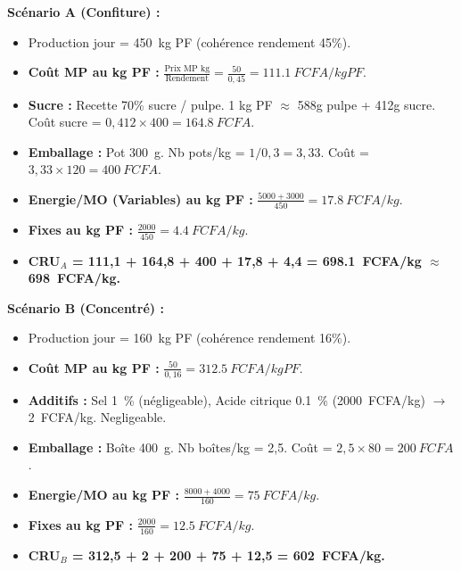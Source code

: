 \documentclass[11pt]{article}
\begin{document}
\begin{exoresolu}
\begin{enumerate}
            \textbf{Scénario A (Confiture) :}
            \begin{itemize}
                \item Production jour = \SI{450}{kg} PF (cohérence rendement 45\%).
                \item \textbf{Coût MP au kg PF :} $\frac{\text{Prix MP kg}}{\text{Rendement}} = \frac{50}{0,45} = \SI{111,1}{FCFA/kg PF}$.
                \item \textbf{Sucre :} Recette 70\% sucre / pulpe. 1 kg PF $\approx$ 588g pulpe + 412g sucre. Coût sucre = $0,412 \times 400 = \SI{164,8}{FCFA}$.
                \item \textbf{Emballage :} Pot \SI{300}{g}. Nb pots/kg = $1/0,3 = 3,33$. Coût = $3,33 \times 120 = \SI{400}{FCFA}$.
                \item \textbf{Energie/MO (Variables) au kg PF :} $\frac{5000+3000}{450} = \SI{17,8}{FCFA/kg}$.
                \item \textbf{Fixes au kg PF :} $\frac{2000}{450} = \SI{4,4}{FCFA/kg}$.
                \item \textbf{CRU$_A$ = 111,1 + 164,8 + 400 + 17,8 + 4,4 = \SI{698,1}{FCFA/kg} $\approx$ \SI{698}{FCFA/kg}.}
            \end{itemize}
            
            \textbf{Scénario B (Concentré) :}
            \begin{itemize}
                \item Production jour = \SI{160}{kg} PF (cohérence rendement 16\%).
                \item \textbf{Coût MP au kg PF :} $\frac{50}{0,16} = \SI{312,5}{FCFA/kg PF}$.
                \item \textbf{Additifs :} Sel \SI{1}{\%} (négligeable), Acide citrique \SI{0,1}{\%} (\SI{2000}{FCFA/kg}) $\rightarrow$ \SI{2}{FCFA/kg}. Negligeable.
                \item \textbf{Emballage :} Boîte \SI{400}{g}. Nb boîtes/kg = 2,5. Coût = $2,5 \times 80 = \SI{200}{FCFA}$.
                \item \textbf{Energie/MO au kg PF :} $\frac{8000+4000}{160} = \SI{75}{FCFA/kg}$.
                \item \textbf{Fixes au kg PF :} $\frac{2000}{160} = \SI{12,5}{FCFA/kg}$.
                \item \textbf{CRU$_B$ = 312,5 + 2 + 200 + 75 + 12,5 = \SI{602}{FCFA/kg}.}
            \end{itemize}
            

\end{enumerate}
\end{exoresolu}
\end{document}
